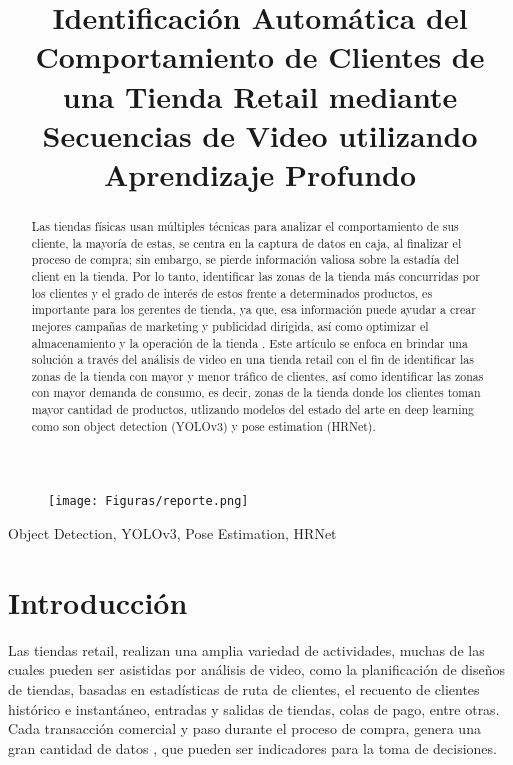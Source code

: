 \documentclass[conference]{IEEEtran}
\author{\IEEEauthorblockN{Paul Percca, Ivan Sipiran} 
\IEEEauthorblockA{Pontificia Universidad Católica del Perú}
\IEEEauthorblockA{Lima, Perú}
\IEEEauthorblockA{cristian.percca@pucp.edu.pe, isipiran@pucp.edu.pe}
}
\title{Identificación Automática del Comportamiento de Clientes de una Tienda Retail mediante Secuencias de Video utilizando Aprendizaje Profundo}
\begin{document}
\begin{figure}[hbtp]
\centering
\texttt{[image: Figuras/reporte.png]}
\end{figure}

\maketitle

\begin{abstract}
Las tiendas físicas usan múltiples técnicas para analizar el comportamiento de sus cliente, la mayoría de estas, se centra en la captura de datos en caja, al finalizar el proceso de compra; sin embargo, se pierde información valiosa sobre la estadía del client en la tienda. Por lo tanto, identificar las zonas de la tienda más concurridas por los clientes y el grado de interés de estos frente a determinados productos, es importante para los gerentes de tienda, ya que, esa información puede ayudar a crear mejores campañas de marketing y publicidad dirigida, así como optimizar el almacenamiento y la operación de la tienda . Este artículo se enfoca en brindar una solución a través del análisis de video en una tienda retail con el fin de identificar las zonas de la tienda con mayor y menor tráfico de clientes, así como identificar las zonas con mayor demanda de consumo, es decir, zonas de la tienda donde los clientes toman mayor cantidad de productos, utlizando modelos del estado del arte en deep learning como son object detection (YOLOv3) y pose estimation (HRNet).

\end{abstract}

\begin{IEEEkeywords}
Object Detection, YOLOv3, Pose Estimation, HRNet
\end{IEEEkeywords}

\section{Introducción}
Las tiendas retail, realizan una amplia variedad de actividades, muchas de las cuales pueden ser asistidas por análisis de video, como la planificación de diseños de tiendas, basadas en estadísticas de ruta de clientes, el recuento de clientes histórico e instantáneo, entradas y salidas de tiendas, colas de pago, entre otras. Cada transacción comercial y paso durante el proceso de compra, genera una gran cantidad de datos \cite{provost2013data}, que pueden ser indicadores para la toma de decisiones.
\end{document}

